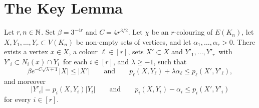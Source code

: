 
\section{The Key Lemma}


\begin{lemma}
  \label{lem:key-lemma} %
  Let \(r, n\in\mathbb{N}\). Set \(\beta = 3^{-4r}\) and \(C = 4r^{3/2}\).
  Let \(\chi\) be an \(r\)-colouring of \(E(K_n)\), let \(X,Y_1,\ldots,Y_r \subset V(K_n)\) be non-empty sets of vertices, and let \(\alpha_1,\ldots,\alpha_r > 0\). There exists a vertex \(x \in X\), a colour \(\ell \in [r]\), sets \(X' \subset X\) and \(Y'_1,\ldots,Y'_r\,\) with \(Y'_i \subset N_i(x) \cap Y_i\,\) for each \(i \in [r]\), and \(\lambda \ge -1\), such that
  \begin{equation}\label{eq:key:ell}
    \beta e^{- C \sqrt{\lambda + 1}} |X| \le |X'| \qquad \text{and} \qquad p_\ell(X,Y_\ell) + \lambda \alpha_\ell \le p_\ell( X', Y'_\ell ) ,
  \end{equation}
  and moreover
  \begin{equation}\label{eq:key:alli}
    |Y'_i| = p_i(X,Y_i) |Y_i| \qquad \text{and} \qquad  p_i(X,Y_i) - \alpha_i \le p_i( X', Y'_i )
  \end{equation}
  for every \(i \in [r]\).
\end{lemma}
%
